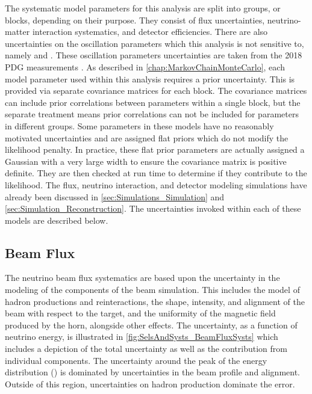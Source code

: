 The systematic model parameters for this analysis are split into groups, or blocks, depending on their purpose. They consist of flux uncertainties, neutrino-matter interaction systematics, and detector efficiencies. There are also uncertainties on the oscillation parameters which this analysis is not sensitive to, namely \delmsqsol and \sinsqsol. These oscillation parameters uncertainties are taken from the 2018 PDG measurements \cite{Tanabashi2018-hp}. As described in \autoref{chap:MarkovChainMonteCarlo}, each model parameter used within this analysis requires a prior uncertainty. This is provided via separate covariance matrices for each block. The covariance matrices can include prior correlations between parameters within a single block, but the separate treatment means prior correlations can not be included for parameters in different groups. Some parameters in these models have no reasonably motivated uncertainties and are assigned flat priors which do not modify the likelihood penalty. In practice, these flat prior parameters are actually assigned a Gaussian with a very large width to ensure the covariance matrix is positive definite. They are then checked at run time to determine if they contribute to the likelihood. The flux, neutrino interaction, and detector modeling simulations have already been discussed in \autoref{sec:Simulations_Simulation} and \autoref{sec:Simulation_Reconstruction}. The uncertainties invoked within each of these models are described below.

\subsection{Beam Flux}
\label{sec:SelsAndSysts_Systs_BeamFlux}

The neutrino beam flux systematics are based upon the uncertainty in the modeling of the components of the beam simulation. This includes the model of hadron productions and reinteractions, the shape, intensity, and alignment of the beam with respect to the target, and the uniformity of the magnetic field produced by the horn, alongside other effects. The uncertainty, as a function of neutrino energy, is illustrated in \autoref{fig:SelsAndSysts_BeamFluxSysts} which includes a depiction of the total uncertainty as well as the contribution from individual components. The uncertainty around the peak of the energy distribution () is dominated by uncertainties in the beam profile and alignment. Outside of this region, uncertainties on hadron production dominate the error.

